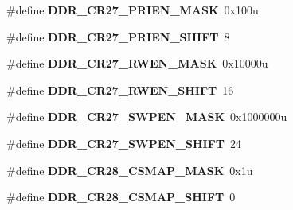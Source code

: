 \begin{DoxyCompactItemize}
\item 
\hypertarget{group___d_d_r___register___masks_gab0797f1c58458f262850af8177cf540c}{}\#define {\bfseries D\+D\+R\+\_\+\+C\+R27\+\_\+\+P\+R\+I\+E\+N\+\_\+\+M\+A\+S\+K}~0x100u\label{group___d_d_r___register___masks_gab0797f1c58458f262850af8177cf540c}

\item 
\hypertarget{group___d_d_r___register___masks_gab08166185809739db4a44e36f44ef2e1}{}\#define {\bfseries D\+D\+R\+\_\+\+C\+R27\+\_\+\+P\+R\+I\+E\+N\+\_\+\+S\+H\+I\+F\+T}~8\label{group___d_d_r___register___masks_gab08166185809739db4a44e36f44ef2e1}

\item 
\hypertarget{group___d_d_r___register___masks_ga85c26206b8a2371ee3d0eee93ad35f62}{}\#define {\bfseries D\+D\+R\+\_\+\+C\+R27\+\_\+\+R\+W\+E\+N\+\_\+\+M\+A\+S\+K}~0x10000u\label{group___d_d_r___register___masks_ga85c26206b8a2371ee3d0eee93ad35f62}

\item 
\hypertarget{group___d_d_r___register___masks_gaee39945e1d8ccc00d7a169fc46ac8d56}{}\#define {\bfseries D\+D\+R\+\_\+\+C\+R27\+\_\+\+R\+W\+E\+N\+\_\+\+S\+H\+I\+F\+T}~16\label{group___d_d_r___register___masks_gaee39945e1d8ccc00d7a169fc46ac8d56}

\item 
\hypertarget{group___d_d_r___register___masks_ga569b7146adbdf10342f26b2b0039dc19}{}\#define {\bfseries D\+D\+R\+\_\+\+C\+R27\+\_\+\+S\+W\+P\+E\+N\+\_\+\+M\+A\+S\+K}~0x1000000u\label{group___d_d_r___register___masks_ga569b7146adbdf10342f26b2b0039dc19}

\item 
\hypertarget{group___d_d_r___register___masks_ga767d36bbe0334c42bb18171b5e9fc072}{}\#define {\bfseries D\+D\+R\+\_\+\+C\+R27\+\_\+\+S\+W\+P\+E\+N\+\_\+\+S\+H\+I\+F\+T}~24\label{group___d_d_r___register___masks_ga767d36bbe0334c42bb18171b5e9fc072}

\item 
\hypertarget{group___d_d_r___register___masks_ga838f856066b5e756a2b8613fd6308206}{}\#define {\bfseries D\+D\+R\+\_\+\+C\+R28\+\_\+\+C\+S\+M\+A\+P\+\_\+\+M\+A\+S\+K}~0x1u\label{group___d_d_r___register___masks_ga838f856066b5e756a2b8613fd6308206}

\item 
\hypertarget{group___d_d_r___register___masks_ga8f20d8ebe9d0a676eaded3da17ada072}{}\#define {\bfseries D\+D\+R\+\_\+\+C\+R28\+\_\+\+C\+S\+M\+A\+P\+\_\+\+S\+H\+I\+F\+T}~0\label{group___d_d_r___register___masks_ga8f20d8ebe9d0a676eaded3da17ada072}


\end{DoxyCompactItemize}
